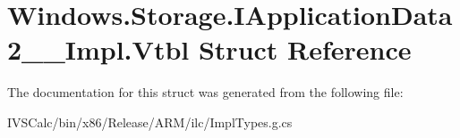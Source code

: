 \hypertarget{struct_windows_1_1_storage_1_1_i_application_data2_____impl_1_1_vtbl}{}\section{Windows.\+Storage.\+I\+Application\+Data2\+\_\+\+\_\+\+Impl.\+Vtbl Struct Reference}
\label{struct_windows_1_1_storage_1_1_i_application_data2_____impl_1_1_vtbl}


The documentation for this struct was generated from the following file\+:\begin{DoxyCompactItemize}
\item 
I\+V\+S\+Calc/bin/x86/\+Release/\+A\+R\+M/ilc/Impl\+Types.\+g.\+cs\end{DoxyCompactItemize}
